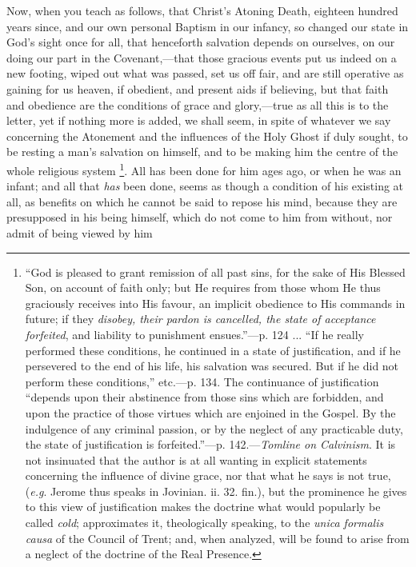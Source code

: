 Now, when you teach as follows, that Christ's Atoning Death,
eighteen hundred years since, and our own personal Baptism in our
infancy, so changed our state in God's sight once for all, that
henceforth salvation depends on ourselves, on our doing our part in
the Covenant,—that those gracious events put us indeed on a new
footing, wiped out what was passed, set us off fair, and are still
operative as gaining for us heaven, if obedient, and present aids if
believing, but that faith and obedience are the conditions of grace
and glory,—true as all this is to the letter, yet if nothing more is
added, we shall seem, in spite of whatever we say concerning the
Atonement and the influences of the Holy Ghost if duly sought, to be
resting a man's salvation on himself, and to be making him the centre
of the whole religious system \footnote{``God is
pleased to grant remission of all past sins, for the sake of His
Blessed Son, on account of faith only; but He requires from those whom
He thus graciously receives into His favour, an implicit obedience to
His commands in future; if they \emph{disobey, their pardon is cancelled,
the state of acceptance forfeited}, and liability to punishment
ensues.''—p. 124 ... ``If he really performed these
conditions, he continued in a state of justification, and if he
persevered to the end of his life, his salvation was secured. But if
he did not perform these conditions,'' etc.—p. 134. The
continuance of justification ``depends upon their abstinence from
those sins which are forbidden, and upon the practice of those virtues
which are enjoined in the Gospel. By the indulgence of any criminal
passion, or by the neglect of any practicable duty, the state of
justification is forfeited.''—p. 142.—\emph{Tomline on Calvinism}.
It is not insinuated that the author is at all wanting in explicit
statements concerning the influence of divine grace, nor that what he
says is not true, (\emph{e.g}. Jerome thus speaks in Jovinian. ii. 32.
fin.), but the prominence he gives to this view of justification makes
the doctrine what would popularly be called \emph{cold}; approximates
it, theologically speaking, to the \emph{unica formalis causa} of the
Council of Trent; and, when analyzed, will be found to arise from a
neglect of the doctrine of the Real Presence.}.
All has been done for him ages ago, or when he was an infant;
and all that \emph{has} been done, seems as though a condition of his
existing at all, as benefits on which he cannot be said to repose his
mind, because they are presupposed in his being himself, which do not
come to him from without, nor admit of being viewed by him
